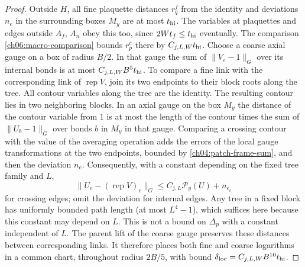 \begin{proof}
Outside $H$, all fine plaquette distances $r_q^f$ from the identity and deviations $n_e$ in the
surrounding boxes $M_y$ are at most $t_{\rm hi}$. The variables at
plaquettes and edges outside $A_f$, $A_n$ obey this too, since $2Wt_f\le t_{\rm hi}$ eventually. The
comparison \eqref{ch06:macro-comparison} bounds $r_p^c$ there by
$C_{j,L,W}t_{\rm hi}$. Choose a coarse axial gauge on a box of radius
$B/2$. In that gauge the sum of $\|V_e-1\|_G$ over its internal bonds is at most $C_{j,L,W}B^5t_{\rm hi}$.
To compare a fine link with the corresponding link of $\operatorname{rep}V$, join its two
endpoints to their block roots along the tree. All contour variables along the tree
are the identity. The resulting contour lies in two neighboring blocks.
In an axial gauge on the box $M_y$ the distance of the contour variable from $1$ is at most
the length of the contour times the sum of $\|U_b-1\|_G$ over bonds $b$
in $M_y$ in that gauge. Comparing a crossing contour with the value of the averaging operation
adds the errors of the local gauge transformations at the two endpoints, bounded by
\eqref{ch04:patch-frame-sum}, and then the deviation $n_e$.
Consequently, with a constant depending on the fixed tree family and $L$,
\[
 \|U_e-(\operatorname{rep}V)_e\|_G
       \le C_{j,L}\mathcal P_y(U)+n_{e_c}
\]
for crossing edges; omit the deviation for internal edges. Any tree in a
fixed block has uniformly bounded path length (at most $L^4-1$), which
suffices here because this constant may depend on $L$. This is not a
bound on $\Delta_p$ with a constant independent of $L$. The parent lift of the coarse gauge preserves
these distances between corresponding links. It therefore places both fine and coarse
logarithms in a common chart, throughout radius $2B/5$, with bound
$\delta_{\rm loc}=C_{j,L,W}B^{10}t_{\rm hi}$.


\end{proof}

